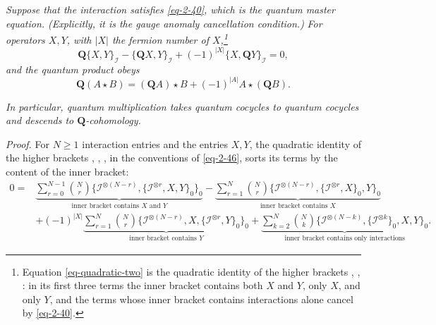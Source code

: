 \documentclass[11pt]{article}
\numberwithin{equation}{section}
\numberwithin{figure}{section}
\numberwithin{table}{section}
\begin{document}
\emph{Suppose that the interaction satisfies \eqref{eq-2-40}, which is the quantum master equation. (Explicitly, it is the gauge anomaly cancellation condition.)} \emph{For operators $X,Y$, with $|X|$ the fermion number of $X$,\footnote{Equation \eqref{eq-quadratic-two} is the quadratic identity of the higher brackets \cite[Section 3.2]{operatope}, \cite[Theorem 7]{Wang}, \cite[Equation (4.19)]{higher}: in its first three terms the inner bracket contains both $X$ and $Y$, only $X$, and only $Y$, and the terms whose inner bracket contains interactions alone cancel by \eqref{eq-2-40}.}}
\begin{equation}\label{eq-2-52}
\mathbf Q\{X,Y\}_{\mathcal I}
-\{\mathbf QX,Y\}_{\mathcal I}
+(-1)^{|X|}\{X,\mathbf QY\}_{\mathcal I}=0,
\end{equation}
\emph{and the quantum product obeys}
\begin{equation}\label{eq-chain}
\mathbf Q(A\star B)
=(\mathbf QA)\star B+(-1)^{|A|}A\star(\mathbf QB).
\end{equation}

\emph{In particular, quantum multiplication takes quantum cocycles to quantum cocycles and descends to $\mathbf Q$-cohomology.}

\emph{Proof.} For $N\ge1$ interaction entries and the entries $X,Y$, the quadratic identity of the higher brackets \cite[Section 3.2]{operatope}, \cite[Theorem 7]{Wang}, \cite[Equation (4.19)]{higher}, in the conventions of \eqref{eq-2-46}, sorts its terms by the content of the inner bracket:
\begin{equation}\label{eq-quadratic-two}
\begin{aligned}
0={}&\underbrace{\sum_{r=0}^{N-1}\binom Nr\{\mathcal I^{\otimes(N-r)},\{\mathcal I^{\otimes r},X,Y\}_0\}_0}_{\text{inner bracket contains }X\text{ and }Y}
-\underbrace{\sum_{r=1}^{N}\binom Nr\{\mathcal I^{\otimes(N-r)},\{\mathcal I^{\otimes r},X\}_0,Y\}_0}_{\text{inner bracket contains }X}\\
&+(-1)^{|X|}\underbrace{\sum_{r=1}^{N}\binom Nr\{\mathcal I^{\otimes(N-r)},X,\{\mathcal I^{\otimes r},Y\}_0\}_0}_{\text{inner bracket contains }Y}
+\underbrace{\sum_{k=2}^{N}\binom Nk\{\mathcal I^{\otimes(N-k)},\{\mathcal I^{\otimes k}\}_0,X,Y\}_0}_{\text{inner bracket contains only interactions}}.
\end{aligned}
\end{equation}
\end{document}
